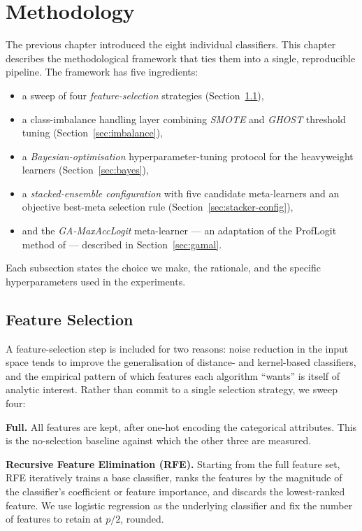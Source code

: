 \chapter{Methodology}\doublespacing
\label{Chapter3}

The previous chapter introduced the eight individual classifiers.
This chapter describes the methodological framework that ties them
into a single, reproducible pipeline. The framework has five
ingredients:
\begin{itemize}
 \item a sweep of four \emph{feature-selection} strategies
 (Section~\ref{sec:fs}),
 \item a class-imbalance handling layer combining \emph{SMOTE} and
 \emph{GHOST} threshold tuning (Section~\ref{sec:imbalance}),
 \item a \emph{Bayesian-optimisation} hyperparameter-tuning protocol
 for the heavyweight learners (Section~\ref{sec:bayes}),
 \item a \emph{stacked-ensemble configuration} with five candidate
 meta-learners and an objective best-meta selection rule
 (Section~\ref{sec:stacker-config}),
 \item and the \emph{GA-MaxAccLogit} meta-learner --- an adaptation
 of the ProfLogit method of \citet{stripling2018proflogit} ---
 described in Section~\ref{sec:gamal}.
\end{itemize}
Each subsection states the choice we make, the rationale, and the
specific hyperparameters used in the experiments.

\section{Feature Selection}
\label{sec:fs}

A feature-selection step is included for two reasons: noise reduction
in the input space tends to improve the generalisation of distance-
and kernel-based classifiers, and the empirical pattern of which
features each algorithm ``wants'' is itself of analytic interest.
Rather than commit to a single selection strategy, we sweep four:

\textbf{Full.} All features are kept, after one-hot encoding the
categorical attributes. This is the no-selection baseline against
which the other three are measured.

\textbf{Recursive Feature Elimination (RFE).} Starting from the full
feature set, RFE iteratively trains a base
classifier, ranks the features by the magnitude of the classifier's
coefficient or feature importance, and discards the lowest-ranked
feature. We use logistic regression as the underlying classifier and
fix the number of features to retain at $p/2$, rounded.

